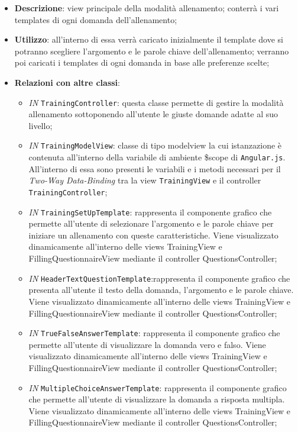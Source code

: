 \begin{itemize}
	\item \textbf{Descrizione}: view principale della modalità allenamento; conterrà i vari templates di ogni domanda dell'allenamento;
	\item \textbf{Utilizzo}: all'interno di essa verrà caricato inizialmente il template dove si potranno scegliere l'argomento e le parole chiave dell'allenamento; verranno poi caricati i templates di ogni domanda in base alle preferenze scelte; 
	\item \textbf{Relazioni con altre classi}:
	\begin{itemize}
		\item \textit{IN} \texttt{TrainingController}: questa classe permette di gestire la modalità allenamento sottoponendo all'utente le giuste domande adatte al suo livello;
		\item \textit{IN} \texttt{TrainingModelView}: classe di tipo modelview la cui istanzazione è contenuta all'interno della variabile di ambiente \$scope di \texttt{Angular.js}. All'interno di essa sono presenti le variabili e i metodi necessari per il \textit{Two-Way Data-Binding} tra la view \texttt{TrainingView} e il controller \texttt{TrainingController};
		\item \textit{IN} \texttt{TrainingSetUpTemplate}: rappresenta il componente grafico che permette all'utente di selezionare l'argomento e le parole chiave per iniziare un allenamento con queste caratteristiche. Viene visualizzato	dinamicamente all'interno delle views TrainingView e FillingQuestionnaireView mediante il controller QuestionsController;
		\item \textit{IN} \texttt{HeaderTextQuestionTemplate}:rappresenta il componente grafico che presenta all'utente il testo della domanda, l'argomento e le parole chiave. Viene visualizzato dinamicamente all'interno delle views TrainingView e FillingQuestionnaireView mediante il controller QuestionsController;
		\item \textit{IN} \texttt{TrueFalseAnswerTemplate}: rappresenta il componente grafico che permette all'utente di visualizzare la domanda vero e falso. Viene visualizzato dinamicamente all'interno delle views TrainingView e FillingQuestionnaireView mediante il controller QuestionsController;
		\item \textit{IN} \texttt{MultipleChoiceAnswerTemplate}: rappresenta il componente grafico che permette all'utente di visualizzare la domanda a risposta multipla. Viene visualizzato dinamicamente all'interno delle views TrainingView e FillingQuestionnaireView mediante il controller QuestionsController;

\end{itemize}
\end{itemize}
